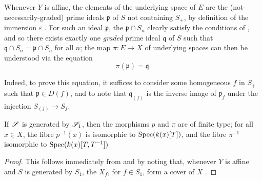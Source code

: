 \begin{remark}[8.3.7]
\label{II.8.3.7}
Whenever $Y$ is affine, the elements of the underlying space of $E$ are the (not-necessarily-graded) prime ideals $\mathfrak{p}$ of $S$ not containing $S_+$, by definition of the immersion $\varepsilon$ .
For such an ideal $\mathfrak{p}$, the $\mathfrak{p}\cap S_n$ clearly satisfy the conditions of , and so there exists exactly one \emph{graded} prime ideal $\mathfrak{q}$ of $S$ such that $\mathfrak{q}\cap S_n=\mathfrak{p}\cap S_n$ for all $n$;
the map $\pi:E\to X$ of underlying spaces can then be understood via the equation
\[
\label{II.8.3.7.1}
  \pi(\mathfrak{p}) = \mathfrak{q}.
\tag{8.3.7.1}
\]

Indeed, to prove this equation, it suffices to consider some homogeneous $f$ in $S_+$ such that $\mathfrak{p}\in D(f)$, and to note that $\mathfrak{q}_{(f)}$ is the inverse image of $\mathfrak{p}_f$ under the injection $S_{(f)}\to S_f$.
\end{remark}

\begin{corollary}[8.3.8]
\label{II.8.3.8}
If $\mathscr{S}$ is generated by $\mathscr{S}_1$, then the morphisms $p$ and $\pi$ are of finite type;
for all $x\in X$, the fibre $p^{-1}(x)$ is isomorphic to $\operatorname{Spec}(k(x)[T])$, and the fibre $\pi^{-1}$ isomorphic to $\operatorname{Spec}(k(x)[T,T^{-1}])$
\end{corollary}

\begin{proof}
This follows immediately from  and  by noting that, whenever $Y$ is affine and $S$ is generated by $S_1$, the $X_f$, for $f\in S_1$, form a cover of $X$ .
\end{proof}


